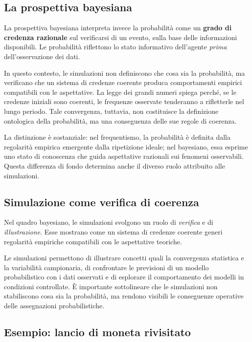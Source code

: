 \documentclass[
  italian,
  letterpaper,
  a4paper,
  11pt,
  open=any]{scrbook}
\theoremstyle{plain}
\theoremstyle{definition}
\theoremstyle{definition}
\theoremstyle{remark}
\begin{document}
\subsection{La prospettiva bayesiana}\label{la-prospettiva-bayesiana}

La prospettiva bayesiana interpreta invece la probabilità come un
\textbf{grado di credenza razionale} sul verificarsi di un evento, sulla
base delle informazioni disponibili. Le probabilità riflettono lo stato
informativo dell'agente \emph{prima} dell'osservazione dei dati.

In questo contesto, le simulazioni non definiscono che cosa sia la
probabilità, ma verificano che un sistema di credenze coerente produca
comportamenti empirici compatibili con le aspettative. La legge dei
grandi numeri spiega perché, se le credenze iniziali sono coerenti, le
frequenze osservate tenderanno a rifletterle nel lungo periodo. Tale
convergenza, tuttavia, non costituisce la definizione ontologica della
probabilità, ma una conseguenza delle sue regole di coerenza.

La distinzione è sostanziale: nel frequentismo, la probabilità è
definita dalla regolarità empirica emergente dalla ripetizione ideale;
nel bayesiano, essa esprime uno stato di conoscenza che guida
aspettative razionali sui fenomeni osservabili. Questa differenza di
fondo determina anche il diverso ruolo attribuito alle simulazioni.

\subsection{Simulazione come verifica di
coerenza}\label{simulazione-come-verifica-di-coerenza}

Nel quadro bayesiano, le simulazioni svolgono un ruolo di
\emph{verifica} e di \emph{illustrazione}. Esse mostrano come un sistema
di credenze coerente generi regolarità empiriche compatibili con le
aspettative teoriche.

Le simulazioni permettono di illustrare concetti quali la convergenza
statistica e la variabilità campionaria, di confrontare le previsioni di
un modello probabilistico con i dati osservati e di esplorare il
comportamento dei modelli in condizioni controllate. È importante
sottolineare che le simulazioni non stabiliscono cosa sia la
probabilità, ma rendono visibili le conseguenze operative delle
assegnazioni probabilistiche.

\subsection{Esempio: lancio di moneta
rivisitato}\label{esempio-lancio-di-moneta-rivisitato}
\end{document}
